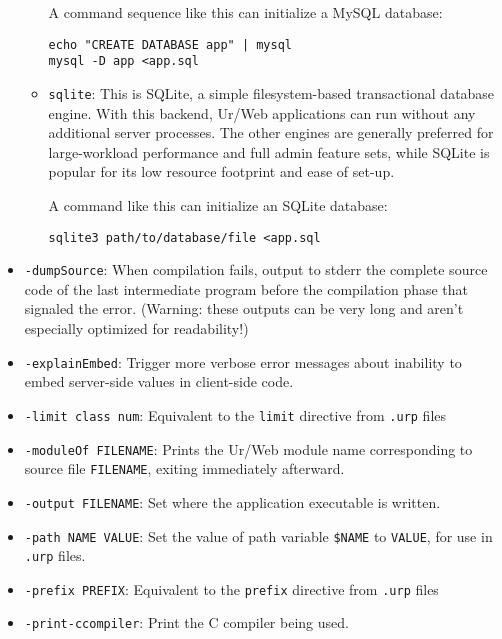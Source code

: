 \documentclass{article}
\begin{document}
\begin{itemize}
\begin{itemize}
    A command sequence like this can initialize a MySQL database:
    \begin{verbatim}
echo "CREATE DATABASE app" | mysql
mysql -D app <app.sql
    \end{verbatim}

  \item \texttt{sqlite}: This is SQLite, a simple filesystem-based transactional database engine.  With this backend, Ur/Web applications can run without any additional server processes.  The other engines are generally preferred for large-workload performance and full admin feature sets, while SQLite is popular for its low resource footprint and ease of set-up.

    A command like this can initialize an SQLite database:
    \begin{verbatim}
sqlite3 path/to/database/file <app.sql
    \end{verbatim}
  \end{itemize}

\item \texttt{-dumpSource}: When compilation fails, output to stderr the complete source code of the last intermediate program before the compilation phase that signaled the error.  (Warning: these outputs can be very long and aren't especially optimized for readability!)

\item \texttt{-explainEmbed}: Trigger more verbose error messages about inability to embed server-side values in client-side code.

\item \texttt{-limit class num}: Equivalent to the \texttt{limit} directive from \texttt{.urp} files

\item \texttt{-moduleOf FILENAME}: Prints the Ur/Web module name corresponding to source file \texttt{FILENAME}, exiting immediately afterward.

\item \texttt{-output FILENAME}: Set where the application executable is written.

\item \texttt{-path NAME VALUE}: Set the value of path variable \texttt{\$NAME} to \texttt{VALUE}, for use in \texttt{.urp} files.

\item \texttt{-prefix PREFIX}: Equivalent to the \texttt{prefix} directive from \texttt{.urp} files

\item \texttt{-print-ccompiler}: Print the C compiler being used.


\end{itemize}
\end{document}
